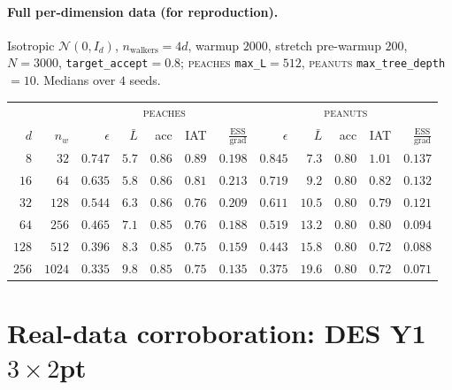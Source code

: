 \documentclass[11pt]{article}
\begin{document}
\paragraph{Full per-dimension data (for reproduction).} Isotropic
$\mathcal N(0,I_d)$, $n_{\text{walkers}}=4d$, warmup $2000$, stretch
pre-warmup $200$, $N=3000$, \texttt{target\_accept}$=0.8$;
\textsc{peaches} \texttt{max\_L}$=512$, \textsc{peanuts}
\texttt{max\_tree\_depth}$=10$. Medians over $4$ seeds.
\begin{center}\scriptsize
\begin{tabular}{r r rrrrr | rrrrr}
\toprule
& & \multicolumn{5}{c|}{\textsc{peaches}} & \multicolumn{5}{c}{\textsc{peanuts}}\\
$d$ & $n_w$ & $\epsilon$ & $\bar L$ & acc & IAT & $\frac{\text{ESS}}{\text{grad}}$
          & $\epsilon$ & $\bar L$ & acc & IAT & $\frac{\text{ESS}}{\text{grad}}$\\
\midrule
$8$   & $32$   & $0.747$ & $5.7$ & $0.86$ & $0.89$ & $0.198$ & $0.845$ & $7.3$  & $0.80$ & $1.01$ & $0.137$\\
$16$  & $64$   & $0.635$ & $5.8$ & $0.86$ & $0.81$ & $0.213$ & $0.719$ & $9.2$  & $0.80$ & $0.82$ & $0.132$\\
$32$  & $128$  & $0.544$ & $6.3$ & $0.86$ & $0.76$ & $0.209$ & $0.611$ & $10.5$ & $0.80$ & $0.79$ & $0.121$\\
$64$  & $256$  & $0.465$ & $7.1$ & $0.85$ & $0.76$ & $0.188$ & $0.519$ & $13.2$ & $0.80$ & $0.80$ & $0.094$\\
$128$ & $512$  & $0.396$ & $8.3$ & $0.85$ & $0.75$ & $0.159$ & $0.443$ & $15.8$ & $0.80$ & $0.72$ & $0.088$\\
$256$ & $1024$ & $0.335$ & $9.8$ & $0.85$ & $0.75$ & $0.135$ & $0.375$ & $19.6$ & $0.80$ & $0.72$ & $0.071$\\
\bottomrule
\end{tabular}
\end{center}

\section{Real-data corroboration: DES Y1 $3\times2$pt}
\end{document}
